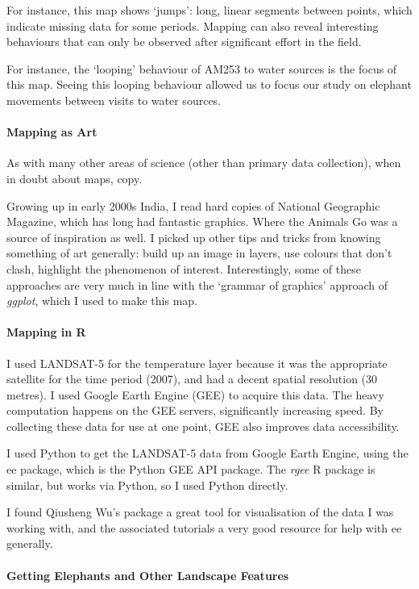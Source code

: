 	For instance, this map shows `jumps': long, linear segments between points, which indicate missing data for some periods. Mapping can also reveal interesting behaviours that can only be observed after significant effort in the field.

	For instance, the `looping' behaviour of AM253 to water sources is the focus of this map. Seeing this looping behaviour allowed us to focus our study on elephant movements between visits to water sources.

	\paragraph*{Mapping as Art}

	As with many other areas of science (other than primary data collection), when in doubt about maps, copy.

	Growing up in early 2000s India, I read hard copies of National Geographic Magazine, which has long had fantastic graphics. Where the Animals Go was a source of inspiration as well. I picked up other tips and tricks from knowing something of art generally: build up an image in layers, use colours that don't clash, highlight the phenomenon of interest. Interestingly, some of these approaches are very much in line with the `grammar of graphics' approach of \textit{ggplot}, which I used to make this map.

	\paragraph*{Mapping in R}

	I used LANDSAT-5 for the temperature layer because it was the appropriate satellite for the time period (2007), and had a decent spatial resolution (30 metres). I used Google Earth Engine (GEE) to acquire this data. The heavy computation happens on the GEE servers, significantly increasing speed. By collecting these data for use at one point, GEE also improves data accessibility.

	I used Python to get the LANDSAT-5 data from Google Earth Engine, using the ee package, which is the Python GEE API package. The \textit{rgee} R package is similar, but works via Python, so I used Python directly.

	I found Qiusheng Wu's \textitgeemap package a great tool for visualisation of the data I was working with, and the associated tutorials a very good resource for help with ee generally.

	\paragraph*{Getting Elephants and Other Landscape Features}

